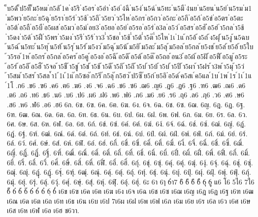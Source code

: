 {็บ5ด้
็ป5ท็
็ม5หม
่ก5ลั
่1ค
่ง5ริ
่ง5อร
่ง5อำ
่ง5อ่
่4ฉี
่น5ง่
่น5ฉ่
่น5ทะ
่น5มื
่4นย
่น5ยน
่น5ย่
่น5รม
่ม1
่ม5พว
่ย5กะ
่ย5ฉุ
่ย5รา
่ย5ร่
่ว5ช้
่ว5ถึ
่ว5ยว
่ว5ไห
่อ5กร
่อ5กว
่อ5กะ
่อ5กี
่อ5ก้
่อ5ข่
่อ5ตร
่อ5ตะ
่อ5ต้
่อ5ถื
่อ5บื
่อ5ผส
่อ5มว
่อ5ม่
่อย3
่อ5ยอ
่อ5ย่
่อ5รอ
่อ5ร่
่อ3ล
่อ5ว่
่อ5สร
่อ5ฮั
่อ5ฮ่
่า5กล
่า5ช้
่า5ดง
่า5ด้
่า5ฝื
่า5พร
่า5มง
่า5รึ
่า5ร้
่าว3
่ำ5ชอ
่ำ5ช้
่ำ5ต้
่ำ5ต๊
่ำ5ไห
่1เ
่1แ
้ก5อ้
้ง5ถ่
้ง5ฝุ
้น5งู
้น5ฉบ
้น5ฉ่
้น5ทะ
้น5ทุ
้น5ท้
้น5รุ
้น5ร่
้ม5งว
้ม5ฉุ
้ม5น้
้ม5ยิ
้ม5ละ
้ม5ลุ
้ม5อล
้ย5กล
้ย5งช
้ย5ล่
้ย5อ้
้ย5ใบ
้ว5รอ
้1ห
้อ5กร
้อ5กล
้อ5คร
้อ5คู
้อ5งอ
้อ5ฉี
้อ5ดึ
้อ5ด้
้อ5ต๊
้อ5ถอ
้อน3
้อ5ผ้
้อ5ฝั
้อ5ฟื
้อ5มู
้อ5ระ
้อ5ร่
้อ5อึ
้อ5ฮื
้า5จอ
้า5ชื
้า5ชู
้า5ช่
้า5ช้
้า5ดี
้า5ถิ
้า5ถึ
้า5บ่
้า5บ้
้า5บ๋
้า5ปี
้า5ผา
้า5ฝร
้า3พ
้า5มุ
้า5ว่
้า5สม
้า5สร
้า5สล
้ำ1
้1เ
้1แ
๊ก5ซอ
๊ก5ริ
๊ก5ลุ
๊ก5ฮว
๊ป5ซี
๊ย5ก่
๋ย5อิ
๋อ5ด๋
์ค5สเ
์ค5แล
์1บ
์1พ
์1ร
์1เ
์1แ
์1โ
.ก6
.ข6
.ฃ6
.ค6
.ฅ6
.ฆ6
.ง6
.จ6
.ฉ6
.ช6
.ซ6
.ฌ6
.ญ6
.ฎ6
.ฏ6
.ฐ6
.ฑ6
.ฒ6
.ณ6
.ด6
.ต6
.ถ6
.ท6
.ธ6
.น6
.บ6
.ป6
.ผ6
.ฝ6
.พ6
.ฟ6
.ภ6
.ม6
.ย6
.ร6
.ฤ6
.ล6
.ฦ6
.ว6
.ศ6
.ษ6
.ส6
.ห6
.ฬ6
.อ6
.ฮ6
6ก.
6ข.
6ฃ.
6ค.
6ฅ.
6ฆ.
6ง.
6จ.
6ฉ.
6ช.
6ซ.
6ฌ.
6ญ.
6ฎ.
6ฏ.
6ฐ.
6ฑ.
6ฒ.
6ณ.
6ด.
6ต.
6ถ.
6ท.
6ธ.
6น.
6บ.
6ป.
6ผ.
6ฝ.
6พ.
6ฟ.
6ภ.
6ม.
6ย.
6ร.
6ล.
6ว.
6ศ.
6ษ.
6ส.
6ห.
6ฬ.
6อ.
6ฮ.
6ก์.
6ข์.
6ฃ์.
6ค์.
6ฅ์.
6ฆ์.
6ง์.
6จ์.
6ฉ์.
6ช์.
6ซ์.
6ฌ์.
6ญ์.
6ฎ์.
6ฏ์.
6ฐ์.
6ฑ์.
6ฒ์.
6ณ์.
6ด์.
6ต์.
6ถ์.
6ท์.
6ธ์.
6น์.
6บ์.
6ป์.
6ผ์.
6ฝ์.
6พ์.
6ฟ์.
6ภ์.
6ม์.
6ย์.
6ร์.
6ล์.
6ว์.
6ศ์.
6ษ์.
6ส์.
6ห์.
6ฬ์.
6อ์.
6ฮ์.
6กิ์.
6ขิ์.
6ฃิ์.
6คิ์.
6ฅิ์.
6ฆิ์.
6งิ์.
6จิ์.
6ฉิ์.
6ชิ์.
6ซิ์.
6ฌิ์.
6ญิ์.
6ฎิ์.
6ฏิ์.
6ฐิ์.
6ฑิ์.
6ฒิ์.
6ณิ์.
6ดิ์.
6ติ์.
6ถิ์.
6ทิ์.
6ธิ์.
6นิ์.
6บิ์.
6ปิ์.
6ผิ์.
6ฝิ์.
6พิ์.
6ฟิ์.
6ภิ์.
6มิ์.
6ยิ์.
6ริ์.
6ลิ์.
6วิ์.
6ศิ์.
6ษิ์.
6สิ์.
6หิ์.
6ฬิ์.
6อิ์.
6ฮิ์.
6กุ์.
6ขุ์.
6ฃุ์.
6คุ์.
6ฅุ์.
6ฆุ์.
6งุ์.
6จุ์.
6ฉุ์.
6ชุ์.
6ซุ์.
6ฌุ์.
6ญุ์.
6ฎุ์.
6ฏุ์.
6ฐุ์.
6ฑุ์.
6ฒุ์.
6ณุ์.
6ดุ์.
6ตุ์.
6ถุ์.
6ทุ์.
6ธุ์.
6นุ์.
6บุ์.
6ปุ์.
6ผุ์.
6ฝุ์.
6พุ์.
6ฟุ์.
6ภุ์.
6มุ์.
6ยุ์.
6รุ์.
6ลุ์.
6วุ์.
6ศุ์.
6ษุ์.
6สุ์.
6หุ์.
6ฬุ์.
6อุ์.
6ฮุ์.
6ะ
6า
6ๅ
6ำ7
6ิ
6ี
6ึ
6ื
6ุ
6ู
แ6
โ6
5ไ6
7ใ6
6็
6่
6้
6๊
6๋
6์
6ํ
6ฺ
6๎
เ6ข
เ6ฃ
เ6ค
เ6ฅ
เ6ฆ
เ6ง
เ6จ
เ6ฉ
เ6ช
เ6ซ
เ6ฌ
เ6ญ
เ6ฎ
เ6ฏ
เ6ฐ
เ6ฑ
เ6ฒ
เ6ณ
เ6ด
เ6ต
เ6ถ
เ6ท
เ6ธ
เ6น
เ6บ
เ6ป
7เ6ผ
เ6ฝ
เ6พ
เ6ฟ
เ6ภ
เ6ม
เ6ย
เ6ร
เ6ล
เ6ว
เ6ศ
เ6ษ
เ6ส
เ6ห
เ6ฬ
เ6อ
เ6ฮ
ช6วา.
}
